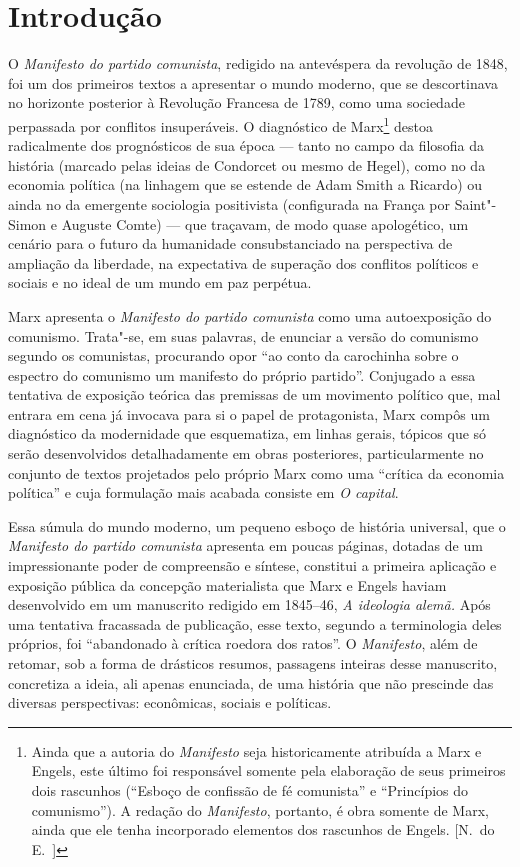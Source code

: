 \chapter[Introdução, por Ricardo Musse]{Introdução}

O \textit{Manifesto do partido comunista}, redigido na antevéspera da
revolução de 1848, foi um dos primeiros textos a apresentar o mundo
moderno, que se descortinava no horizonte posterior à Revolução
Francesa de 1789, como uma sociedade perpassada por conflitos
insuperáveis. O diagnóstico de Marx\footnote{ Ainda que a autoria do \textit{Manifesto} 
seja historicamente atribuída a Marx e Engels, este último foi responsável somente pela 
elaboração de seus primeiros dois rascunhos (“Esboço de confissão de fé comunista” e “Princípios do comunismo”). 
A redação do \textit{Manifesto}, portanto, é obra somente de Marx, ainda que ele tenha incorporado 
elementos dos rascunhos de Engels. [N.~do E.~]} destoa radicalmente dos
prognósticos de sua época --- tanto no campo da filosofia da história
(marcado pelas ideias de Condorcet ou mesmo de Hegel), como no da
economia política (na linhagem que se estende de Adam Smith a Ricardo)
ou ainda no da emergente sociologia positivista (configurada na França
por Saint"-Simon e Auguste Comte) --- que traçavam, de modo quase
apologético, um cenário para o futuro da humanidade consubstanciado na
perspectiva de ampliação da liberdade, na expectativa de superação dos
conflitos políticos e sociais e no ideal de um mundo em paz perpétua.

Marx apresenta o \textit{Manifesto do partido comunista} como uma
autoexposição do comunismo. Trata"-se, em suas palavras, de
enunciar a versão do comunismo segundo os comunistas, procurando opor
“ao conto da carochinha sobre o espectro do comunismo um manifesto do próprio partido”.
Conjugado a essa tentativa de exposição teórica das premissas de um
movimento político que, mal entrara em cena já invocava para si o papel
de protagonista, Marx compôs um diagnóstico da modernidade que
esquematiza, em linhas gerais, tópicos que só serão desenvolvidos
detalhadamente em obras posteriores, particularmente no conjunto de
textos projetados pelo próprio Marx como uma “crítica da economia
política” e cuja formulação mais acabada consiste em \textit{O
capital}.

Essa súmula do mundo moderno, um pequeno esboço de história universal,
que o \textit{Manifesto do partido comunista} apresenta em poucas
páginas, dotadas de um impressionante poder de compreensão e síntese,
constitui a primeira aplicação e exposição pública da concepção
materialista que Marx e Engels haviam desenvolvido em um manuscrito
redigido em 1845--46, \textit{A ideologia alemã.} Após uma tentativa
fracassada de publicação, esse texto, segundo a terminologia deles
próprios, foi “abandonado à crítica roedora dos ratos”. O
\textit{Manifesto}, além de retomar, sob a forma de drásticos resumos,
passagens inteiras desse manuscrito, concretiza a ideia, ali apenas
enunciada, de uma história que não prescinde das diversas perspectivas:
econômicas, sociais e políticas.

